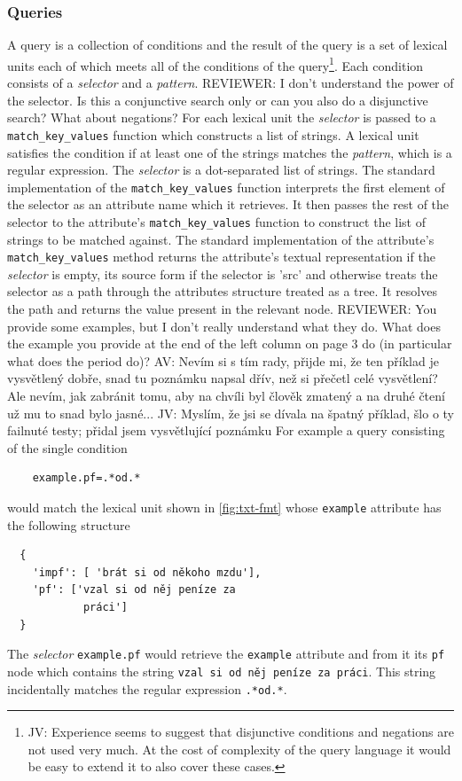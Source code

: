 \documentclass[10pt, a4paper]{article}
\newcommand{\py}[1]{{\tt #1}}
\newcommand{\att}[1]{{\tt #1}}
\newcommand{\av}[1]{{\color{ansa} AV: #1}}
\newcommand{\jv}[1]{{\color{svlinks} JV: #1}}
\newcommand{\rrr}[1]{{\color{red} REVIEWER: #1}}
\begin{document}
\subsubsection{Queries}\label{sec:query}
A query is a collection of conditions
and the result of the query is a set of lexical units each of which meets all
of the conditions of the query\footnote{\jv{Experience seems to suggest that disjunctive conditions
and negations are not used very much. At the cost of complexity of the query language it would
be easy to extend it to also cover these cases.}}. Each condition consists of a \emph{selector} and a
\emph{pattern}.
\rrr{I don't understand the power of the selector. Is this a conjunctive search only or can you also do a disjunctive search? What about negations?}
For each lexical unit the \emph{selector} is passed to a \py{match\_key\_values}
function which constructs a list of strings. A lexical unit satisfies the condition if at
least one of the strings matches the \emph{pattern}, which is a regular expression.
The \emph{selector} is a dot-separated list of strings. The standard implementation of the
\py{match\_key\_values} function interprets the first element of the selector as an attribute
name which it retrieves. It then passes the rest of the selector to the attribute's \py{match\_key\_values}
function to construct the list of strings to be matched against. The standard implementation
of the attribute's \py{match\_key\_values} method returns the attribute's textual representation
if the \emph{selector} is empty, its source form if the selector is 'src' and otherwise treats
the selector as a path through the attributes structure treated as a tree. It resolves the path and returns the
value present in the relevant node. 
\rrr{You provide some examples, but I don't really understand what they do. What does the example you provide at the end of the left column on page 3 do (in particular what does the period do)?}
\av{Nevím si s tím rady, přijde mi, že ten příklad je vysvětlený dobře, snad tu poznámku napsal dřív, než si přečetl celé vysvětlení? Ale nevím, jak zabránit tomu, aby na chvíli byl člověk zmatený a na druhé čtení už mu to snad bylo jasné...}
\jv{Myslím, že jsi se dívala na špatný příklad, šlo o ty failnuté testy; přidal jsem vysvětlující poznámku}
For example a query consisting of the single condition
\begin{verbatim}
    example.pf=.*od.*
\end{verbatim}
would match the lexical unit shown in \autoref{fig:txt-fmt} whose \att{example} attribute
has the following structure
\begin{verbatim}
  {
    'impf': [ 'brát si od někoho mzdu'],
    'pf': ['vzal si od něj peníze za
            práci']
  }
\end{verbatim}
The \emph{selector} \att{example.pf} would retrieve the \att{example} attribute and from it
its \att{pf} node which contains the string {\tt vzal si od něj peníze za práci}. This string
incidentally matches the regular expression {\tt .*od.*}.
\end{document}
